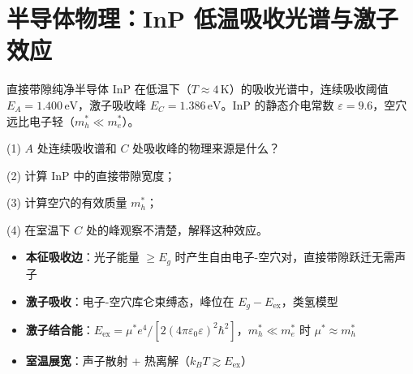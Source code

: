 \section{半导体物理：InP 低温吸收光谱与激子效应}
\label{sec:inp-exciton}

\begin{modelbox}
直接带隙纯净半导体 InP 在低温下（$T\approx4\,\text{K}$）的吸收光谱中，连续吸收阈值 $E_A=1.400\,\text{eV}$，激子吸收峰 $E_C=1.386\,\text{eV}$。InP 的静态介电常数 $\varepsilon=9.6$，空穴远比电子轻（$m_h^*\ll m_e^*$）。

(1) $A$ 处连续吸收谱和 $C$ 处吸收峰的物理来源是什么？

(2) 计算 InP 中的直接带隙宽度；

(3) 计算空穴的有效质量 $m_h^*$；

(4) 在室温下 $C$ 处的峰观察不清楚，解释这种效应。
\end{modelbox}

\begin{tipbox}[考点快速分析]
\begin{itemize}
    \item \textbf{本征吸收边}：光子能量 $\ge E_g$ 时产生自由电子-空穴对，直接带隙跃迁无需声子
    \item \textbf{激子吸收}：电子-空穴库仑束缚态，峰位在 $E_g-E_{\text{ex}}$，类氢模型
    \item \textbf{激子结合能}：$E_{\text{ex}}=\mu^*e^4/[2(4\pi\varepsilon_0\varepsilon)^2\hbar^2]$，$m_h^*\ll m_e^*$ 时 $\mu^*\approx m_h^*$
    \item \textbf{室温展宽}：声子散射 + 热离解（$k_BT\gtrsim E_{\text{ex}}$）
\end{itemize}
\end{tipbox}

